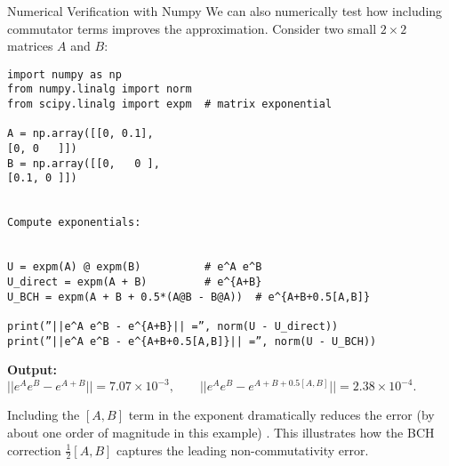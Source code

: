 \documentclass{beamer}
\begin{document}
\begin{frame}[fragile]{Numerical Verification with Numpy}
We can also numerically test how including commutator terms improves the approximation. Consider two small $2\times 2$ matrices $A$ and $B$:
\begin{verbatim}
import numpy as np
from numpy.linalg import norm
from scipy.linalg import expm  # matrix exponential

A = np.array([[0, 0.1],
[0, 0   ]])
B = np.array([[0,   0 ],
[0.1, 0 ]])


Compute exponentials:


U = expm(A) @ expm(B)          # e^A e^B
U_direct = expm(A + B)         # e^{A+B}
U_BCH = expm(A + B + 0.5*(A@B - B@A))  # e^{A+B+0.5[A,B]}

print(”||e^A e^B - e^{A+B}|| =”, norm(U - U_direct))
print(”||e^A e^B - e^{A+B+0.5[A,B]}|| =”, norm(U - U_BCH))
\end{verbatim}

\textbf{Output:}\
{\footnotesize{}$\displaystyle ||e^A e^B - e^{A+B}|| = 7.07\times 10^{-3}, \qquad
||e^A e^B - e^{A+B+0.5[A,B]}|| = 2.38\times 10^{-4}.$}

\vspace{1ex}
Including the $[A,B]$ term in the exponent dramatically reduces the error (by about one order of magnitude in this example) . This illustrates how the BCH correction $\frac{1}{2}[A,B]$ captures the leading non-commutativity error.
\end{frame}
\end{document}
